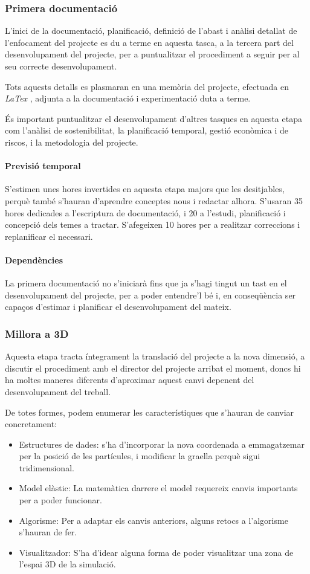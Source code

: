 \documentclass[a4paper]{article} %
\begin{document}
	\subsubsection{Primera documentació}
	L'inici de la documentació, planificació, definició de l'abast i anàlisi detallat de l'enfocament del projecte es du a terme en aquesta tasca, a la tercera part del desenvolupament del projecte, per a puntualitzar el procediment a seguir per al seu correcte desenvolupament. \par
	Tots aquests detalls es plasmaran en una memòria del projecte, efectuada en \textit{LaTex} \cite{latex}, adjunta a la documentació i experimentació duta a terme.\par
	És important puntualitzar el desenvolupament d'altres tasques en aquesta etapa com l'anàlisi de sostenibilitat, la planificació temporal, gestió econòmica i de riscos, i la metodologia del projecte.
	\paragraph{\quad Previsió temporal} S'estimen unes hores invertides en aquesta etapa majors que les desitjables, perquè també s'hauran d'aprendre conceptes nous i redactar alhora. S'usaran 35 hores dedicades a l'escriptura de documentació, i 20 a l'estudi, planificació i concepció dels temes a tractar. S'afegeixen 10 hores per a realitzar correccions i replanificar el necessari.
	\paragraph{\quad Dependències} La primera documentació no s'iniciarà fins que ja s'hagi tingut un tast en el desenvolupament del projecte, per a poder entendre'l bé i, en conseqüència ser capaços d'estimar i planificar el desenvolupament del mateix.
	
	\subsubsection{Millora a 3D}
	Aquesta etapa tracta íntegrament la translació del projecte a la nova dimensió, a discutir el procediment amb el director del projecte arribat el moment, doncs hi ha moltes maneres diferents d'aproximar aquest canvi depenent del desenvolupament del treball. \par
	De totes formes, podem enumerar les característiques que s'hauran de canviar concretament:
	\begin{itemize}
		\item Estructures de dades: s'ha d'incorporar la nova coordenada a emmagatzemar per la posició de les partícules, i modificar la graella perquè sigui tridimensional.
		\item Model elàstic: La matemàtica darrere el model requereix canvis importants per a poder funcionar.
		\item Algorisme: Per a adaptar els canvis anteriors, alguns retocs a l'algorisme s'hauran de fer.
		\item Visualitzador: S'ha d'idear alguna forma de poder visualitzar una zona de l'espai 3D de la simulació.
	\end{itemize}
\end{document}
